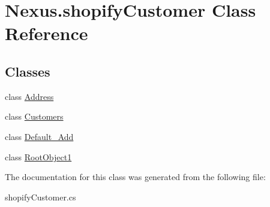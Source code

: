 \hypertarget{class_nexus_1_1shopify_customer}{}\section{Nexus.\+shopify\+Customer Class Reference}
\label{class_nexus_1_1shopify_customer}
\subsection*{Classes}
\begin{DoxyCompactItemize}
\item 
class \mbox{\hyperlink{class_nexus_1_1shopify_customer_1_1_address}{Address}}
\item 
class \mbox{\hyperlink{class_nexus_1_1shopify_customer_1_1_customers}{Customers}}
\item 
class \mbox{\hyperlink{class_nexus_1_1shopify_customer_1_1_default___add}{Default\+\_\+\+Add}}
\item 
class \mbox{\hyperlink{class_nexus_1_1shopify_customer_1_1_root_object1}{Root\+Object1}}
\end{DoxyCompactItemize}


The documentation for this class was generated from the following file\+:\begin{DoxyCompactItemize}
\item 
shopify\+Customer.\+cs\end{DoxyCompactItemize}
